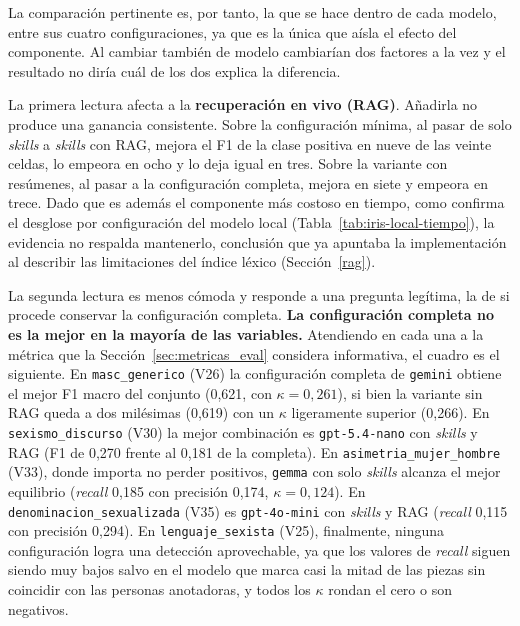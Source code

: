 La comparación pertinente es, por tanto, la que se hace dentro de cada modelo, entre
sus cuatro configuraciones, ya que es la única que aísla el efecto del componente. Al
cambiar también de modelo cambiarían dos factores a la vez y el resultado no diría cuál
de los dos explica la diferencia.



La primera lectura afecta a la \textbf{recuperación en vivo (RAG)}. Añadirla no produce una
ganancia consistente. Sobre la configuración mínima, al pasar de solo \textit{skills} a
\textit{skills} con RAG, mejora el F1 de la clase positiva en nueve de las veinte celdas,
lo empeora en ocho y lo deja igual en tres. Sobre la variante con resúmenes, al pasar a la configuración
completa, mejora en siete y empeora en trece. Dado que es además el componente más
costoso en tiempo, como confirma el desglose por configuración del modelo local
(Tabla~\ref{tab:iris-local-tiempo}), la evidencia no respalda mantenerlo, conclusión que ya apuntaba la implementación al describir las limitaciones
del índice léxico (Sección~\ref{rag}).

La segunda lectura es menos cómoda y responde a una pregunta legítima, la de si
procede conservar la configuración completa. \textbf{La configuración completa no
es la mejor en la mayoría de las variables.} Atendiendo en cada una a la métrica
que la Sección~\ref{sec:metricas_eval} considera informativa, el cuadro es el
siguiente. En \texttt{masc\_generico} (V26) la configuración completa de
\texttt{gemini} obtiene el mejor F1 macro del conjunto (0,621, con
$\kappa = 0,261$), si bien la variante sin RAG queda a dos milésimas (0,619) con un
$\kappa$ ligeramente superior (0,266). En \texttt{sexismo\_discurso} (V30) la mejor
combinación es \texttt{gpt-5.4-nano} con \textit{skills} y RAG (F1 de 0,270 frente
al 0,181 de la completa). En \texttt{asimetria\_mujer\_hombre} (V33), donde importa
no perder positivos, \texttt{gemma} con solo \textit{skills} alcanza el mejor
equilibrio (\textit{recall} 0,185 con precisión 0,174, $\kappa = 0,124$). En
\texttt{denominacion\_sexualizada} (V35) es \texttt{gpt-4o-mini} con \textit{skills}
y RAG (\textit{recall} 0,115 con precisión 0,294). En \texttt{lenguaje\_sexista} (V25),
finalmente, ninguna configuración logra una detección aprovechable, ya que los
valores de \textit{recall} siguen siendo muy bajos salvo en el modelo que marca casi la mitad
de las piezas sin coincidir con las personas anotadoras, y todos los $\kappa$ rondan el cero o
son negativos.

